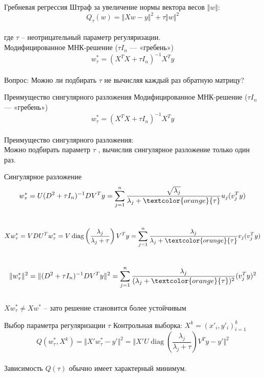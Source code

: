 \documentclass[10pt]{beamer}
\begin{document}
{
\begin{frame}{Гребневая регрессия}
	Штраф за увеличение нормы вектора весов $\Vert w \Vert$:\\
	$$Q_{\tau} (w) = \Vert X w - y \Vert^2 + \tau \Vert w \Vert^2$$\\
	где $\tau$ -- неотрицательный параметр регуляризации.\\
  \pause
	\bigbreak
	Модифицированное МНК-решение ($\tau I_n$ — «гребень»)\\
	$$w^*_{\tau} = (X^T X + \tau I_n)^{-1}X^Ty$$\\
  \pause	
  \bigbreak
	\alert{Вопрос:} Можно ли подбирать $\tau$ не вычисляя каждый раз обратную матрицу?
\end{frame}
}

\begin{frame}{Преимущество сингулярного разложения}
	Модифицированное МНК-решение ($\tau I_n$ — «гребень»)\\
	$$w^*_{\tau} = (X^TX + \tau I_n)^{-1}X^Ty$$\\
	\pause
	\bigbreak
	Преимущество сингулярного разложения:\\
	Можно подбирать параметр $\tau$ , вычислив сингулярное разложение только один раз.
\end{frame}

\begin{frame}{Сингулярное разложение}
	$$w_{\tau}^*= U(D^2 + \tau I_n)^{-1}DV^Ty = \sum\limits_{j=1}^n \frac{\sqrt{\lambda_j}}{\lambda_j + \textcolor{orange}{\tau}} u_j(v_j^Ty)$$\\
	\pause
	$$Xw_{\tau}^* = VDU^Tw_{\tau}^* = V \operatorname{diag} \left(\frac{\lambda_j}{\lambda_j + \tau}\right) V^Ty = \sum\limits_{j=1}^n \frac{\lambda_j}{\lambda_j + \textcolor{orange}{\tau}} v_j (v_j^Ty)$$\\
	\pause
	$$\Vert w_{\tau}^* \Vert^2 = \Vert (D^2 + \tau I_n)^{-1} DV^T y \Vert^2 = \sum\limits_{j=1}^n \frac{\lambda_j}{(\lambda_j + \textcolor{orange}{\tau})^2} (v^T_j y)^2$$\\
	\pause
	$X w_{\tau}^* \neq Xw^*$ -- зато решение становится более устойчивым
\end{frame}

\begin{frame}{Выбор параметра регуляризации $\tau$}
	Контрольная выборка: $X^k = (x'_i, y'_i)_{i=1}^k$\\
	$$Q(w_{\tau}^*,X^k) = \Vert X' w_{\tau}^* - y' \Vert^2 = \Vert X'U \operatorname{diag} \left(\frac{\lambda_j}{\lambda_j + \tau}\right) V^T y -y' \Vert^2$$\\
	\bigbreak
	\pause
	Зависимость $Q(\tau)$ обычно имеет характерный минимум.
\end{frame}
\end{document}
